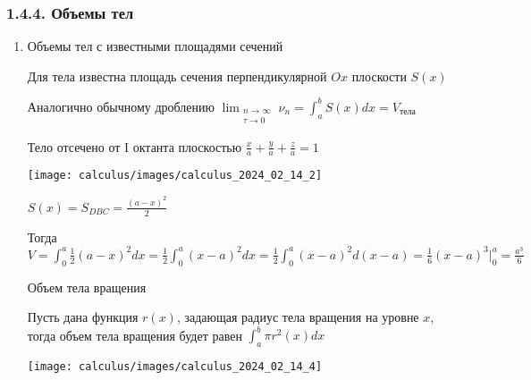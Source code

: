 \documentclass[12pt]{article}
\begin{document}
    \subsubsection{1.4.4. Объемы тел}

    \begin{enumerate}[label*=\arabic** ]
        \item \hypertarget{volumeofbodieswithknownarea}{Объемы тел с известными площадями сечений}

        Для тела известна площадь сечения перпендикулярной $Ox$ плоскости $S(x)$

        Аналогично обычному дроблению $\lim_{\substack{n \to \infty \\ \tau \to 0}} \nu_n = \int^b_a S(x)dx = V_\text{тела}$

        \Ex Тело отсечено от I октанта плоскостью $\frac{x}{a} + \frac{y}{a} + \frac{z}{a} = 1$

        \texttt{[image: calculus/images/calculus\_2024\_02\_14\_2]}

        $S(x) = S_{DBC} = \frac{(a - x)^2}{2}$

        Тогда $V = \int_0^a \frac{1}{2} (a - x)^2 dx = \frac{1}{2} \int_0^a (x - a)^2 dx =
        \frac{1}{2} \int^a_0 (x - a)^2 d(x - a) = \frac{1}{6} (x - a)^3 \Big|^a_0 = \frac{a^3}{6}$

        \Nota \hypertarget{volumeofbodyofrevolution}{Объем тела вращения}

        Пусть дана функция $r(x)$, задающая радиус тела вращения на уровне $x$,
        тогда объем тела вращения будет равен $\int_a^b \pi r^2(x) dx$

        \texttt{[image: calculus/images/calculus\_2024\_02\_14\_4]}
    \end{enumerate}
\end{document}
